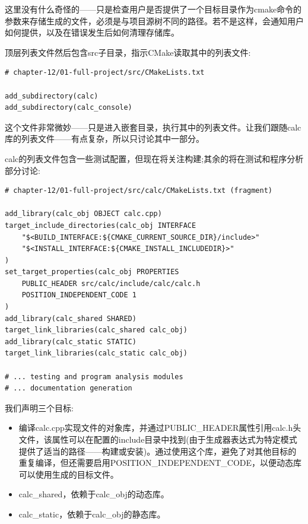 这里没有什么奇怪的——只是检查用户是否提供了一个目标目录作为cmake命令的参数来存储生成的文件，必须是与项目源树不同的路径。若不是这样，会通知用户如何提供，以及在错误发生后如何清理存储库。

顶层列表文件然后包含src子目录，指示CMake读取其中的列表文件:

\begin{lstlisting}[style=styleCMake]
# chapter-12/01-full-project/src/CMakeLists.txt

add_subdirectory(calc)
add_subdirectory(calc_console)
\end{lstlisting}

这个文件非常微妙——只是进入嵌套目录，执行其中的列表文件。让我们跟随calc库的列表文件——有点复杂，所以只讨论其中一部分。


calc的列表文件包含一些测试配置，但现在将关注构建;其余的将在测试和程序分析部分讨论:

\begin{lstlisting}[style=styleCMake]
# chapter-12/01-full-project/src/calc/CMakeLists.txt (fragment)

add_library(calc_obj OBJECT calc.cpp)
target_include_directories(calc_obj INTERFACE
	"$<BUILD_INTERFACE:${CMAKE_CURRENT_SOURCE_DIR}/include>"
	"$<INSTALL_INTERFACE:${CMAKE_INSTALL_INCLUDEDIR}>"
)
set_target_properties(calc_obj PROPERTIES
	PUBLIC_HEADER src/calc/include/calc/calc.h
	POSITION_INDEPENDENT_CODE 1
)
add_library(calc_shared SHARED)
target_link_libraries(calc_shared calc_obj)
add_library(calc_static STATIC)
target_link_libraries(calc_static calc_obj)

# ... testing and program analysis modules
# ... documentation generation
\end{lstlisting}

我们声明三个目标:

\begin{itemize}
\item 
编译calc.cpp实现文件的对象库，并通过PUBLIC\_HEADER属性引用calc.h头文件，该属性可以在配置的include目录中找到(由于生成器表达式为特定模式提供了适当的路径——构建或安装)。通过使用这个库，避免了对其他目标的重复编译，但还需要启用POSITION\_INDEPENDENT\_CODE，以便动态库可以使用生成的目标文件。

\item 
calc\_shared，依赖于calc\_obj的动态库。

\item 
calc\_static，依赖于calc\_obj的静态库。
\end{itemize}


